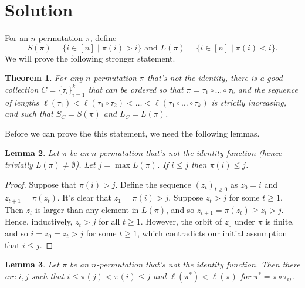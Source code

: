\documentclass[psamsfonts]{amsart}
\newtheorem{theorem}{Theorem}[section]
\newtheorem{lem}[theorem]{Lemma}
\theoremstyle{definition}
\theoremstyle{remark}
\numberwithin{equation}{section}
\begin{document}
\section{Solution}
For an $n$-permutation $\pi$, define \[S(\pi)=\{i\in [n]\mid \pi(i)>i\}\text{ and }L(\pi)=\{i\in [n]\mid \pi(i)<i\}.\]
We will prove the following stronger statement.
\begin{theorem}\label{thm}
For any $n$-permutation $\pi$ that's not the identity, there is a good collection $C=\{\tau_i\}_{i=1}^k$ that can be ordered so that $\pi=\tau_1\circ\ldots\circ\tau_k$ and the sequence of lengths $\ell(\tau_1)<\ell(\tau_1\circ\tau_2)<\ldots<\ell(\tau_1\circ\ldots\circ\tau_k)$ is strictly increasing, and such that $S_C=S(\pi)$ and $L_C=L(\pi)$.
\end{theorem}
Before we can prove the this statement, we need the following lemmas.
\begin{lem}\label{lemma1}
Let $\pi$ be an $n$-permutation that's not the identity function (hence trivially $L(\pi)\neq \emptyset$). Let $j=\max L(\pi)$. If $i\leq j$ then $\pi(i)\leq j$.
\end{lem}
\begin{proof}
Suppose that $\pi(i)>j$. Define the sequence $(z_t)_{t\geq 0}$ as $z_0=i$ and $z_{t+1}=\pi(z_t)$. It's clear that $z_1=\pi(i)>j$. Suppose $z_t>j$ for some $t\geq 1$. Then $z_t$ is larger than any element in $L(\pi)$, and so $z_{t+1}=\pi(z_t)\geq z_t>j$. Hence, inductively, $z_t>j$ for all $t\geq 1$. However, the orbit of $z_0$ under $\pi$ is finite, and so $i=z_0=z_t>j$ for some $t\geq 1$, which contradicts our initial assumption that $i\leq j$. 
\end{proof}
\begin{lem}\label{lemma2}
Let $\pi$ be an $n$-permutation that's not the identity function. Then there are $i,j$ such that $i\leq \pi(j)<\pi(i)\leq j$ and $\ell(\pi^*)<\ell(\pi)$ for $\pi^*=\pi\circ \tau_{ij}$.
\end{lem}
\end{document}
